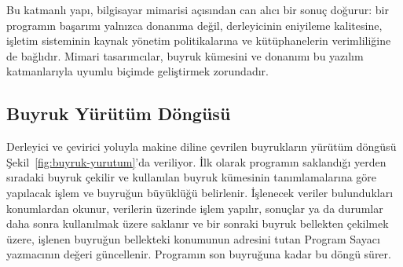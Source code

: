 Bu katmanlı yapı, bilgisayar mimarisi açısından can alıcı bir sonuç doğurur: bir programın başarımı yalnızca donanıma değil, derleyicinin eniyileme kalitesine, işletim sisteminin kaynak yönetim politikalarına ve kütüphanelerin verimliliğine de bağlıdır. Mimari tasarımcılar, buyruk kümesini ve donanımı bu yazılım katmanlarıyla uyumlu biçimde geliştirmek zorundadır.

\subsection{Buyruk Yürütüm Döngüsü}
\label{subsec:buyruk-yurutum-dongusu}

Derleyici ve çevirici yoluyla makine diline çevrilen buyrukların yürütüm döngüsü Şekil~\ref{fig:buyruk-yurutum}'da veriliyor. İlk olarak programın saklandığı yerden sıradaki buyruk çekilir ve kullanılan buyruk kümesinin tanımlamalarına göre yapılacak işlem ve buyruğun büyüklüğü belirlenir. İşlenecek veriler bulundukları konumlardan okunur, verilerin üzerinde işlem yapılır, sonuçlar ya da durumlar daha sonra kullanılmak üzere saklanır ve bir sonraki buyruk bellekten çekilmek üzere, işlenen buyruğun bellekteki konumunun adresini tutan Program Sayacı yazmacının değeri güncellenir. Programın son buyruğuna kadar bu döngü sürer.

